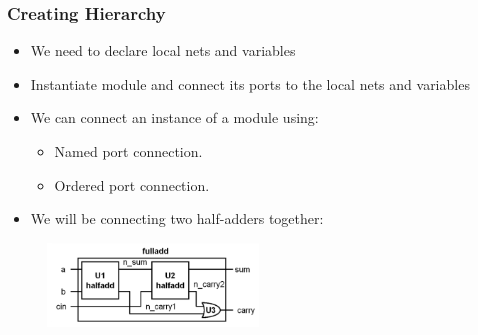 \documentclass[t]{beamer}
\begin{document}
\begin{frame}
\frametitle{Creating Hierarchy}

\begin{itemize}
\item We need to declare local nets and variables
\item Instantiate module and connect its ports to the local nets and variables
\item We can connect an instance of a module using:
\begin{itemize}
	\item Named port connection.
	\item Ordered port connection.
\end{itemize}
\item We will be connecting two half-adders together:
\end{itemize}

\begin{figure}[H!]
    \includegraphics[width=0.5\textwidth]{img/03_fulladd.png}
\end{figure}

\end{frame}
\end{document}
